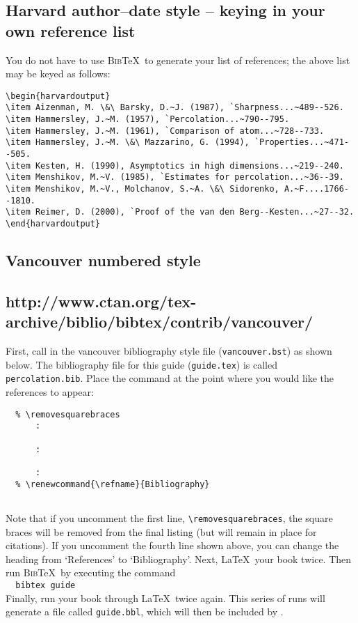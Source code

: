 \subsection*{Harvard author--date style -- keying in your own reference list}
You do not have to use \textsc{Bib}\TeX\ to generate your list of references; the above list may be keyed as follows:
\begin{verbatim}
\begin{harvardoutput}
\item Aizenman, M. \&\ Barsky, D.~J. (1987), `Sharpness...~489--526.
\item Hammersley, J.~M. (1957), `Percolation...~790--795.
\item Hammersley, J.~M. (1961), `Comparison of atom...~728--733.
\item Hammersley, J.~M. \&\ Mazzarino, G. (1994), `Properties...~471--505.
\item Kesten, H. (1990), Asymptotics in high dimensions...~219--240.
\item Menshikov, M.~V. (1985), `Estimates for percolation...~36--39.
\item Menshikov, M.~V., Molchanov, S.~A. \&\ Sidorenko, A.~F....1766--1810.
\item Reimer, D. (2000), `Proof of the van den Berg--Kesten...~27--32.
\end{harvardoutput}
\end{verbatim}

\subsection{Vancouver numbered style}

\subsection*{http://www.ctan.org/tex-archive/biblio/bibtex/contrib/vancouver/}

First, call in the vancouver bibliography style file (\verb"vancouver.bst") as shown below. The bibliography file for this guide (\texttt{\cambridge guide.tex}) is called \texttt{percolation.bib}. Place the \verb"" command at the point where you would like the references to appear:
%
\begin{verbatim}
  % \removesquarebraces
      :
    
      :
    
      :
  % \renewcommand{\refname}{Bibliography}
    
\end{verbatim}
%
Note that if you uncomment the first line, \verb"\removesquarebraces", the square braces will be removed from the final listing (but will remain in place for citations). If you uncomment the fourth line shown above, you can change the heading from `References' to `Bibliography'. Next, \LaTeX\ your book twice. Then run \textsc{Bib}\TeX\ by executing the command\\[0.5\baselineskip]
\verb"  bibtex "\texttt{\cambridge guide}\\[0.5\baselineskip]
Finally, run your book through \LaTeX\ twice again. This series of runs will generate a file called \texttt{\cambridge guide.bbl}, which will then be included by \verb"".

